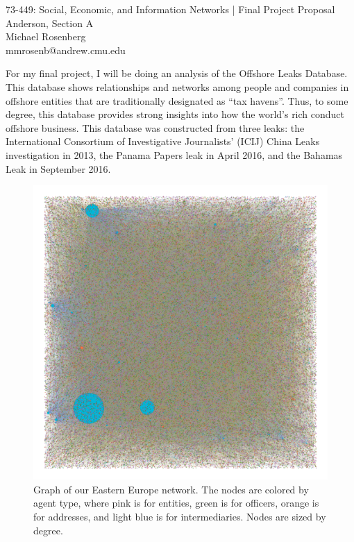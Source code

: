 \documentclass[11pt]{article}
\makeatletter
\newcommand{\myname}{Michael Rosenberg}
\newcommand{\myandrew}{mmrosenb@andrew.cmu.edu}
\newcommand{\mycourse}{73-449: Social, Economic, and Information Networks}
\newcommand{\myhwname}{| Final Project Proposal}
\newcommand{\myrecitation}{Anderson, Section A}
\newcommand{\myteammates}{}
\makeatother
\begin{document}
\begin{center}
    {\Large \mycourse} {\Large \myhwname} \\
    \myrecitation \\
    \myname \\
    \myandrew \\
\end{center}

For my final project, I will be doing an analysis of the Offshore Leaks
Database. This database shows relationships and networks among people and
companies in offshore entities that are traditionally designated as ``tax
havens''. Thus, to some degree, this database provides strong insights into how
the world's rich conduct offshore business. This database was constructed from
three leaks: the International Consortium of Investigative Journalists' (ICIJ)
China Leaks investigation in 2013, the Panama Papers leak in April 2016, and the
Bahamas Leak in September 2016.


\begin{figure}[h!]
    \centering
    \includegraphics[width = 5in]{../analysis/figures/easternEuropeNetwork.png}
    \caption{Graph of our Eastern Europe network. The nodes are colored by
        agent type, where pink is for entities, green is for officers,
        orange is for addresses, and light blue is for intermediaries. Nodes
        are sized by degree.}
\end{figure}
\end{document}
